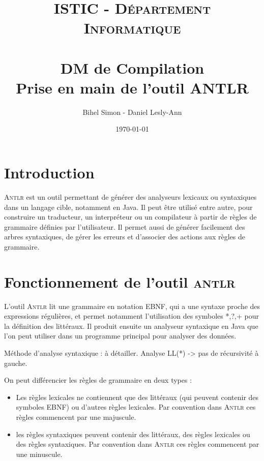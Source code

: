 \documentclass[paper=a4, fontsize=11pt]{scrartcl} %
\title{	
\normalfont \normalsize 
\textsc{ISTIC - Département Informatique} \\ [25pt]
\horrule{0.5pt} \\[0.4cm]
\huge DM de Compilation \\[0.2cm]
\Large Prise en main de l'outil ANTLR
\horrule{2pt} \\[0.5cm]
}
\author{Bihel Simon - Daniel Lesly-Ann}
\date{\normalsize\today}
\numberwithin{equation}{section} %
\numberwithin{figure}{section} %
\numberwithin{table}{section} %
\begin{document}
\maketitle


\section*{Introduction}
\textsc{Antlr} est un outil permettant de générer des analyseurs lexicaux ou syntaxiques dans un langage cible, notamment en Java. Il peut être utilisé entre autre, pour construire un traducteur, un interpréteur ou un compilateur à partir de règles de grammaire définies par l'utilisateur. Il permet aussi de générer facilement des arbres syntaxiques, de gérer les erreurs et d'associer des actions aux règles de grammaire.




\section{Fonctionnement de l'outil \textsc{antlr}}

L'outil \textsc{Antlr} lit une grammaire en notation EBNF, qui a une syntaxe proche des expressions régulières, et permet notamment l'utilisation des symboles {*,?,+} pour la définition des littéraux. Il produit ensuite un analyseur syntaxique en Java que l'on peut utiliser dans un programme principal pour analyser des données.

Méthode d'analyse syntaxique : à détailler. Analyse LL(*) -> pas de récursivité à gauche.

On peut différencier les règles de grammaire en deux types :
\begin{itemize}
 \item Les règles lexicales ne contiennent que des littéraux (qui peuvent contenir des symboles EBNF) ou d'autres règles lexicales. Par convention dans \textsc{Antlr} ces règles commencent par une majuscule.
 \item les règles syntaxiques peuvent contenir des littéraux, des règles lexicales ou des règles syntaxiques. Par convention dans \textsc{Antlr} ces règles commencent par une minuscule.
\end{itemize}

\end{document}
